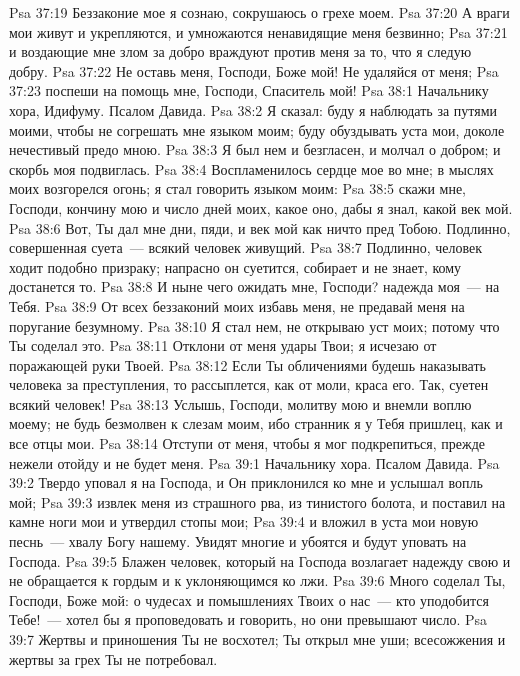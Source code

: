 \vs Psa 37:19 Беззаконие мое я сознаю, сокрушаюсь о грехе моем.
\vs Psa 37:20 А враги мои живут и укрепляются, и умножаются ненавидящие меня безвинно;
\vs Psa 37:21 и воздающие мне злом за добро враждуют против меня за то, что я следую добру.
\vs Psa 37:22 Не оставь меня, Господи, Боже мой! Не удаляйся от меня;
\vs Psa 37:23 поспеши на помощь мне, Господи, Спаситель мой!
\vs Psa 38:1 Начальнику хора, Идифуму. Псалом Давида.
\rsbpar\vs Psa 38:2 Я сказал: буду я наблюдать за путями моими, чтобы не согрешать мне языком моим; буду обуздывать уста мои, доколе нечестивый предо мною.
\vs Psa 38:3 Я был нем и безгласен, и молчал  о добром; и скорбь моя подвиглась.
\vs Psa 38:4 Воспламенилось сердце мое во мне; в мыслях моих возгорелся огонь; я стал говорить языком моим:
\vs Psa 38:5 скажи мне, Господи, кончину мою и число дней моих, какое оно, дабы я знал, какой век мой.
\vs Psa 38:6 Вот, Ты дал мне дни,  пяди, и век мой как ничто пред Тобою. Подлинно, совершенная суета~--- всякий человек живущий.
\vs Psa 38:7 Подлинно, человек ходит подобно призраку; напрасно он суетится, собирает и не знает, кому достанется то.
\vs Psa 38:8 И ныне чего ожидать мне, Господи? надежда моя~--- на Тебя.
\vs Psa 38:9 От всех беззаконий моих избавь меня, не предавай меня на поругание безумному.
\vs Psa 38:10 Я стал нем, не открываю уст моих; потому что Ты соделал это.
\vs Psa 38:11 Отклони от меня удары Твои; я исчезаю от поражающей руки Твоей.
\vs Psa 38:12 Если Ты обличениями будешь наказывать человека за преступления, то рассыплется, как от моли, краса его. Так, суетен всякий человек!
\vs Psa 38:13 Услышь, Господи, молитву мою и внемли воплю моему; не будь безмолвен к слезам моим, ибо странник я у Тебя  пришлец, как и все отцы мои.
\vs Psa 38:14 Отступи от меня, чтобы я мог подкрепиться, прежде нежели отойду и не будет меня.
\vs Psa 39:1 Начальнику хора. Псалом Давида.
\rsbpar\vs Psa 39:2 Твердо уповал я на Господа, и Он приклонился ко мне и услышал вопль мой;
\vs Psa 39:3 извлек меня из страшного рва, из тинистого болота, и поставил на камне ноги мои и утвердил стопы мои;
\vs Psa 39:4 и вложил в уста мои новую песнь~--- хвалу Богу нашему. Увидят многие и убоятся и будут уповать на Господа.
\vs Psa 39:5 Блажен человек, который на Господа возлагает надежду свою и не обращается к гордым и к уклоняющимся ко лжи.
\vs Psa 39:6 Много соделал Ты, Господи, Боже мой: о чудесах и помышлениях Твоих о нас~--- кто уподобится Тебе!~--- хотел бы я проповедовать и говорить, но они превышают число.
\vs Psa 39:7 Жертвы и приношения Ты не восхотел; Ты открыл мне уши; всесожжения и жертвы за грех Ты не потребовал.
